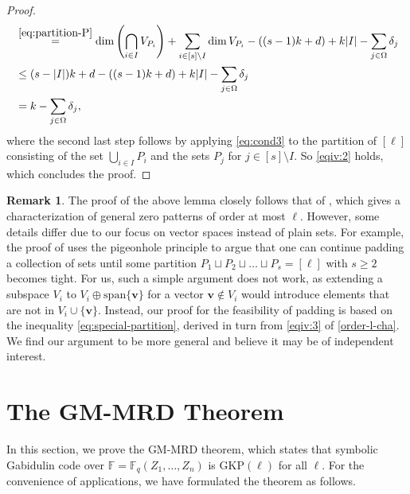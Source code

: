 \documentclass[11pt]{article}
\newif\ifmynotes
\newcommand{\ZGnote}[1]{\ifmynotes\textcolor{purple}{[Zeyu: #1]}\else\fi}
\theoremstyle{plain}
\theoremstyle{definition}
\newtheorem{rmka}[thm]{Remark}
\theoremstyle{remark}
\newcommand{\F}{\mathbb{F}}
\newcommand{\bv}{\bm{v}}
\begin{document}
\begin{proof}
\begin{align*}
&\stackrel{\eqref{eq:partition-P}}{=}\dim\left(\bigcap_{i\in I}V_{P_i}\right)+\sum_{i\in [s]\setminus I}\dim V_{P_i}-((s-1)k+d)+k|I|-\sum_{j\in \Omega}\delta_j\\
& \leq (s-|I|)k+d-((s-1)k+d)+k|I|-\sum_{j\in \Omega}\delta_j\\ &=k-\sum_{j\in \Omega}\delta_j,
\end{align*}
where the second last step follows by applying \eqref{eq:cond3} to the partition of $[\ell]$ consisting of the set $\bigcup_{i\in I}P_i$ and the sets $P_j$ for $j\in [s]\setminus I$. So \cref{eqiv:2} holds, which concludes the proof.
\end{proof}

\begin{rmka}
The proof of the above lemma closely follows that of \cite[Lemma~2.8]{brakensiek2023generic}, which gives a characterization of general zero patterns of order at most $\ell$. 
However, some details differ due to our focus on vector spaces instead of plain sets.
For example, the proof of \cite[Lemma~2.8]{brakensiek2023generic} uses the pigeonhole principle to argue that one can continue padding a collection of sets until some partition $P_1\sqcup P_2\sqcup\dots\sqcup P_s=[\ell]$ with $s\geq 2$ becomes tight.
For us, such a simple argument does not work, as extending a subspace $V_i$ to $V_i\oplus\mathrm{span}\{\bv\}$ for 
a vector $\bv\not\in V_i$ would introduce elements that are not in $V_i\cup\{\bv\}$. Instead, our proof for the feasibility of padding is based on the inequality \eqref{eq:special-partition}, derived in turn from \cref{eqiv:3} of \cref{order-l-cha}. We find our argument to be more general and believe it may be of independent interest.
\end{rmka}

\section{The GM-MRD Theorem}\label{gmmrdsec}

In this section, we prove the GM-MRD theorem, which states that symbolic Gabidulin code over $\F=\F_q(Z_1,\dots,Z_n)$ is $\mathrm{GKP}(\ell)$ for all $\ell$. For the convenience of applications, we have formulated the theorem as follows.
\end{document}

